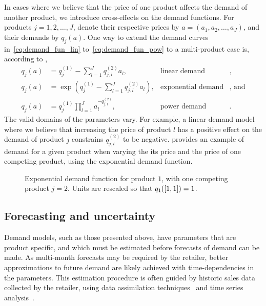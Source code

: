 \documentclass[main.tex]{subfiles}
\begin{document}
In cases where we believe that the price of one product affects the
demand of another product, we introduce cross-effects on the demand
functions. For products $j=1,2,\dots,J$, denote their respective prices by
$a=(a_1,a_2,\dots,a_J)$, and their demands by $q_j(a)$.
One way to extend the demand curves in~\eqref{eq:demand_fun_lin}
to~\eqref{eq:demand_fun_pow} to a multi-product case is, according to \cite{talluri2006theory},
\begin{align}
  q_j(a)&=q_{j}^{(1)}-\sum_{l=1}^Jq_{j,l}^{(2)}a_l,
  &\text{linear demand}&,\\
  q_j(a)&=\exp\left( q_{j}^{(1)}-\sum_{l=1}^Jq_{j,l}^{(2)}a_l
          \right),
  &\text{exponential demand}&\text{, and}\\
  q_j(a)&=q_j^{(1)}\prod_{l=1}^Ja_l^{-q_{j,l}^{(2)}},
  &\text{power demand}&.
\end{align}
The valid domains of the parameters vary. For example, a linear demand
model where we believe that increasing the price of product $l$ has a
positive effect on the demand of product $j$ constrains
$q_{j,l}^{(2)}$ to be negative. 
provides an example of demand for a given product when varying the
its price and the price of one competing product, using the exponential demand function.

\begin{figure}[htbp]
  \centering
  \caption{Exponential demand function for product $1$, with one
    competing product $j=2$.
    Units are rescaled so that $q_1(\left[1,1\right])=1$.
  }\label{fig:demand_exponential_two}
\end{figure}

\subsection{Forecasting and uncertainty}
Demand models, such as those presented above, have parameters that are
product specific, and which must be estimated before forecasts of
demand can be made.
As multi-month forecasts may be required by the retailer, better
approximations to future demand are likely achieved with
time-dependencies in the parameters.
This estimation procedure is often guided by
historic sales data collected by the retailer, using data assimilation
techniques~\cite{law2015data} and time series analysis~\cite{chatfield2004analysis}.
\end{document}
